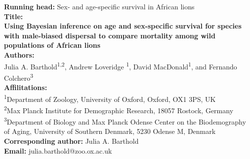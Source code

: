 \begin{titlepage}
\thispagestyle{empty}
\begin{flushleft}
\textbf{Running head:} Sex- and age-specific survival in African lions\\
\vspace*{0.35in}
\textbf{Title:}\\
 \textbf{Using Bayesian inference on age and sex-specific survival for species with male-biased dispersal to compare mortality among wild populations of African lions}\\
%
\vspace*{0.35in}
%
\textbf{Authors:}\\ Julia A. Barthold\textsuperscript{1,2}, Andrew Loveridge \textsuperscript{1}, David MacDonald\textsuperscript{1}, and Fernando Colchero\textsuperscript{3}\\
%
\vspace*{0.35in}
%
\textbf{Affilitations:}\\
\textsuperscript{1}Department of Zoology, University of Oxford, Oxford, OX1 3PS, UK\\
\textsuperscript{2}Max Planck Institute for Demographic Research, 18057 Rostock, Germany\\
\textsuperscript{3}Department of Biology and Max Planck Odense Center on the Biodemography of Aging, University of Southern Denmark, 5230 Odense M, Denmark\\
%
\vspace*{0.35in}
\textbf{Corresponding author:} Julia A. Barthold\\
\textbf{Email:} julia.barthold@zoo.ox.ac.uk
\end{flushleft}
\end{titlepage}
\setcounter{page}{2}
